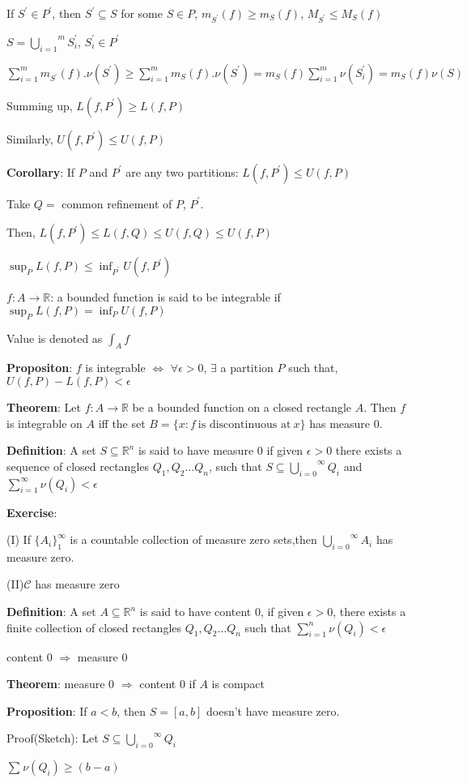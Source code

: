 \documentclass{article}
\begin{document}
\begin{flushleft}
If $S^{'}\in P^{'}$, then $S^{'}\subseteq S$ for some $S\in P$, $m_{S^{'}}(f)\geq m_S(f)$, $M_{S^{'}}\leq M_S(f)$

$S=\overset{m}{\underset{i=1}{\bigcup}} S_i^{'}$, $S_i^{'}\in P^{'}$

$\sum_{i=1}^{m} m_{S^{'}}(f).\nu(S^{'})\geq \sum_{i=1}^{m} m_S(f).\nu(S^{'})=m_S(f)\sum_{i=1}^{m} \nu(S_i^{'})=m_S(f) \nu(S)$

Summing up, $L(f,P^{'})\geq L(f,P)$

Similarly, $U(f,P^{'})\leq U(f,P)$

\textbf{Corollary}: If $P$ and $P^{'}$ are any two partitions: $L(f,P^{'})\leq U(f,P)$

Take $Q=$ common refinement of $P$, $P^{'}$.

Then, $L(f,P^{'})\leq L(f,Q) \leq U(f,Q) \leq U(f,P)$ 

$\sup_{P} L(f,P)\leq \inf_{P^{'}} U(f,P^{'})$

$f: A\rightarrow \mathds{R}$: a bounded function is said to be integrable if $\sup_{P} L(f,P)=\inf_{P} U(f,P)$

Value is denoted as $\int_{A}^{} f$

\textbf{Propositon}: $f$ is integrable $\Leftrightarrow$ $\forall \epsilon >0$,
$\exists$ a partition $P$ such that, $U(f,P)-L(f,P)<\epsilon$ 

\textbf{Theorem}: Let $f:A \rightarrow \mathds{R}$ be a bounded function on a closed rectangle $A$. Then $f$ is integrable on $A$ iff the set $B= \{x: f \: \text{is discontinuous at}\: x\}$ has measure 0.

\textbf{Definition}: A set $S\subseteq \mathds{R}^n$ is said to have measure 0 if given $\epsilon>0$ there exists a sequence of closed rectangles $Q_1,Q_2\dots Q_n$, such that $S\subseteq \overset{\infty}{\underset{i=0}{\bigcup}} Q_i$ and $\sum_{i=1}^{\infty} \nu(Q_i)<\epsilon$

\textbf{Exercise}: 

(I) If $\{A_i\}_1^{\infty}$ is a countable collection of measure zero sets,then $\overset{\infty}{\underset{i=0}{\bigcup}} A_i$ has measure zero.

(II)$\mathscr{C}$ has measure zero

\textbf{Definition}: A set $A\subseteq \mathds{R}^n$ is said to have content 0, if given $\epsilon>0$, there exists a finite collection of closed rectangles $Q_1,Q_2 \dots Q_n$ such that $\sum_{i=1}^{n} \nu(Q_i) <\epsilon$

content 0 $\Rightarrow$ measure 0 

\textbf{Theorem}: measure 0 $\Rightarrow$ content 0 if $A$ is compact 

\textbf{Proposition}: If $a<b$, then $S=[a,b]$ doesn't have measure zero.  

Proof(Sketch): Let $S\subseteq \overset{\infty}{\underset{i=0}{\bigcup}} Q_i$

$\sum_{}^{} \nu(Q_i) \geq (b-a)$

\end{flushleft}
\end{document}
